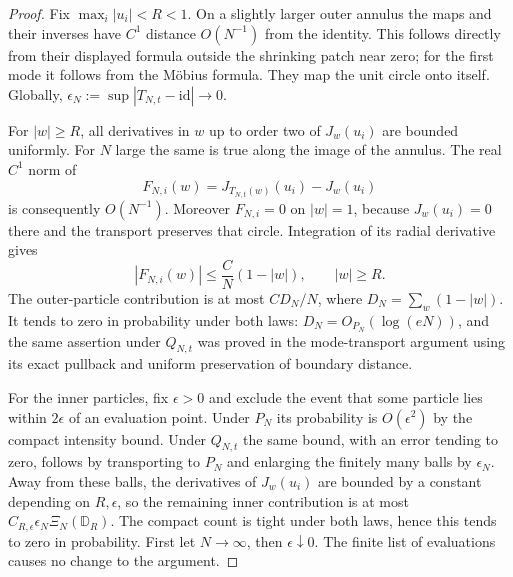 \documentclass[11pt,a4paper]{article}
\numberwithin{equation}{section}
\theoremstyle{definition}
\theoremstyle{remark}
\newcommand{\D}{\mathbb D}
\begin{document}
\begin{proof}
Fix $\max_i|u_i|<R<1$. On a slightly larger outer annulus the maps
and their inverses have $C^1$ distance $O(N^{-1})$ from the identity.
This follows directly from their displayed formula outside the
shrinking patch near zero; for the first mode it follows from the
M\"obius formula. They map the unit circle onto itself.
Globally, $\epsilon_N:=\sup|T_{N,t}-\mathrm{id}|\to0$.

For $|w|\ge R$, all derivatives in $w$ up to order two of $J_w(u_i)$
are bounded uniformly. For $N$ large the same is true along the
image of the annulus. The real $C^1$ norm of
\[
 F_{N,i}(w)=J_{T_{N,t}(w)}(u_i)-J_w(u_i)
\]
is consequently $O(N^{-1})$. Moreover $F_{N,i}=0$ on $|w|=1$,
because $J_w(u_i)=0$ there and the transport preserves that circle.
Integration of its radial derivative gives
\begin{equation}\label{eq:green-force-boundary-transport-bound}
 |F_{N,i}(w)|\le \frac{C}{N}(1-|w|),\qquad |w|\ge R.
\end{equation}
The outer-particle contribution is at most $CD_N/N$, where
$D_N=\sum_w(1-|w|)$. It tends to zero in probability under both laws:
$D_N=O_{P_N}(\log(eN))$, and the same assertion under $Q_{N,t}$
was proved in the mode-transport argument using its exact pullback
and uniform preservation of boundary distance.

For the inner particles, fix $\epsilon>0$ and exclude the event that
some particle lies within $2\epsilon$ of an evaluation point. Under
$P_N$ its probability is $O(\epsilon^2)$ by the compact intensity
bound. Under $Q_{N,t}$ the same bound, with an error tending to zero,
follows by transporting to $P_N$ and enlarging the finitely many balls
by $\epsilon_N$. Away from these balls, the derivatives of $J_w(u_i)$
are bounded by a constant depending on $R,\epsilon$, so the remaining
inner contribution is at most
$C_{R,\epsilon}\epsilon_N\Xi_N(\D_R)$. The compact count is tight
under both laws, hence this tends to zero in probability. First let
$N\to\infty$, then $\epsilon\downarrow0$. The finite list of
evaluations causes no change to the argument.
\end{proof}
\end{document}
